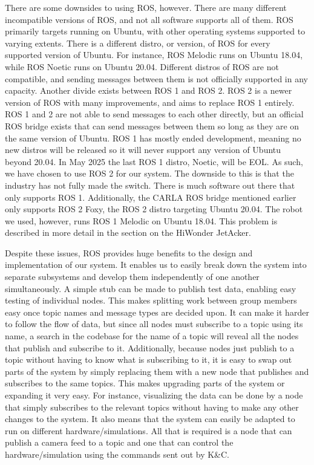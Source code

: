 \documentclass[titlepage,draft]{article}
\begin{document}
{There are some downsides to using ROS, however. There are many different incompatible versions of ROS, and not all software supports all of them. ROS primarily targets running on Ubuntu, with other operating systems supported to varying extents. There is a different distro, or version, of ROS for every supported version of Ubuntu. For instance, ROS Melodic runs on Ubuntu 18.04, while ROS Noetic runs on Ubuntu 20.04. Different distros of ROS are not compatible, and sending messages between them is not officially supported in any capacity. Another divide exists between ROS 1 and ROS 2. ROS 2 is a newer version of ROS with many improvements, and aims to replace ROS 1 entirely. ROS 1 and 2 are not able to send messages to each other directly, but an official ROS bridge exists that can send messages between them so long as they are on the same version of Ubuntu. ROS 1 has mostly ended development, meaning no new distros will be released so it will never support any version of Ubuntu beyond 20.04. In May 2025 the last ROS 1 distro, Noetic, will be EOL. As such, we have chosen to use ROS 2 for our system. The downside to this is that the industry has not fully made the switch. There is much software out there that only supports ROS 1. Additionally, the CARLA ROS bridge mentioned earlier only supports ROS 2 Foxy, the ROS 2 distro targeting Ubuntu 20.04. The robot we used, however, runs ROS 1 Melodic on Ubuntu 18.04. This problem is described in more detail in the section on the HiWonder JetAcker.

Despite these issues, ROS provides huge benefits to the design and implementation of our system. It enables us to easily break down the system into separate subsystems and develop them independently of one another simultaneously. A simple stub can be made to publish test data, enabling easy testing of individual nodes. This makes splitting work between group members easy once topic names and message types are decided upon. It can make it harder to follow the flow of data, but since all nodes must subscribe to a topic using its name, a search in the codebase for the name of a topic will reveal all the nodes that publish and subscribe to it. Additionally, because nodes just publish to a topic without having to know what is subscribing to it, it is easy to swap out parts of the system by simply replacing them with a new node that publishes and subscribes to the same topics. This makes upgrading parts of the system or expanding it very easy. For instance, visualizing the data can be done by a node that simply subscribes to the relevant topics without having to make any other changes to the system. It also means that the system can easily be adapted to run on different hardware/simulations. All that is required is a node that can publish a camera feed to a topic and one that can control the hardware/simulation using the commands sent out by K\&C.

}
\end{document}
